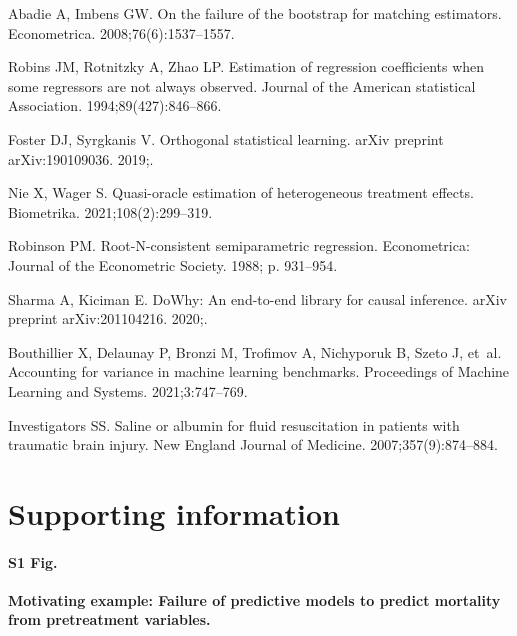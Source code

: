 \documentclass[10pt,letterpaper]{article}
\begin{document}
\begin{thebibliography}{100}
  Abadie A, Imbens GW.
  \newblock On the failure of the bootstrap for matching estimators.
  \newblock Econometrica. 2008;76(6):1537--1557.

  Robins JM, Rotnitzky A, Zhao LP.
  \newblock Estimation of regression coefficients when some regressors are not always observed.
  \newblock Journal of the American statistical Association. 1994;89(427):846--866.

  Foster DJ, Syrgkanis V.
  \newblock Orthogonal statistical learning.
  \newblock arXiv preprint arXiv:190109036. 2019;.

  Nie X, Wager S.
  \newblock Quasi-oracle estimation of heterogeneous treatment effects.
  \newblock Biometrika. 2021;108(2):299--319.

  Robinson PM.
  \newblock Root-N-consistent semiparametric regression.
  \newblock Econometrica: Journal of the Econometric Society. 1988; p. 931--954.

  Sharma A, Kiciman E.
  \newblock DoWhy: An end-to-end library for causal inference.
  \newblock arXiv preprint arXiv:201104216. 2020;.

  Bouthillier X, Delaunay P, Bronzi M, Trofimov A, Nichyporuk B, Szeto J, et~al.
  \newblock Accounting for variance in machine learning benchmarks.
  \newblock Proceedings of Machine Learning and Systems. 2021;3:747--769.

  Investigators SS.
  \newblock Saline or albumin for fluid resuscitation in patients with traumatic brain injury.
  \newblock New England Journal of Medicine. 2007;357(9):874--884.

\end{thebibliography}


\clearpage

\section*{Supporting information}

\paragraph*{S1 Fig.}
\label{apd:motivating_example}
{\bf Motivating example: Failure of predictive models to predict mortality
  from pretreatment variables.}
\end{document}
